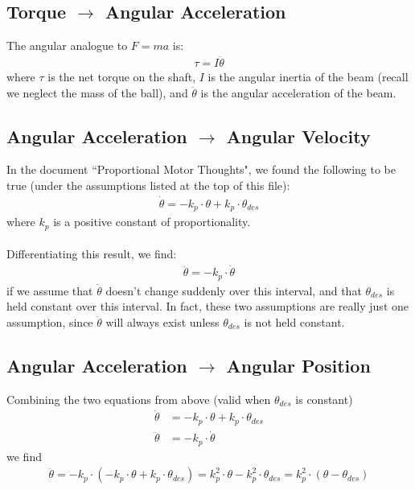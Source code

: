 \documentclass[a4paper]{article}
\begin{document}
\subsection*{Torque $\rightarrow$ Angular Acceleration}
The angular analogue to $F = ma$ is:
\begin{align*}
\tau = I \ddot{\theta}
\end{align*}
where $\tau$ is the net torque on the shaft, $I$ is the angular inertia of the beam (recall we neglect the mass of the ball), and $\ddot{\theta}$ is the angular acceleration of the beam.
\subsection*{Angular Acceleration $\rightarrow$ Angular Velocity}
In the document ``Proportional Motor Thoughts", we found the following to be true (under the assumptions listed at the top of this file):
\begin{align*}
\dot{\theta} = -k_p \cdot \theta + k_p \cdot \theta_{des}
\end{align*}
where $k_p$ is a positive constant of proportionality.
\\\\
Differentiating this result, we find:
\begin{align*}
\ddot{\theta} = -k_p \cdot \dot{\theta}
\end{align*}
if we assume that $\dot{\theta}$ doesn't change suddenly over this interval, and that $\theta_{des}$ is held constant over this interval. In fact, these two assumptions are really just one assumption, since $\ddot{\theta}$ will always exist unless  $\theta_{des}$ is not held constant. 

\subsection*{Angular Acceleration $\rightarrow$ Angular Position}
Combining the two equations from above (valid when $\theta_{des}$ is constant)
\begin{align*}
\dot{\theta} &= -k_p \cdot \theta + k_p \cdot \theta_{des} \\
\ddot{\theta} &= -k_p \cdot \dot{\theta}
\end{align*}
we find
\begin{align*}
\ddot{\theta} = -k_p  \cdot (-k_p \cdot \theta + k_p \cdot \theta_{des}) = k_p^2  \cdot  \theta -  k_p^2 \cdot \theta_{des} = k_p^2 \cdot (\theta - \theta_{des})
\end{align*}
\end{document}

